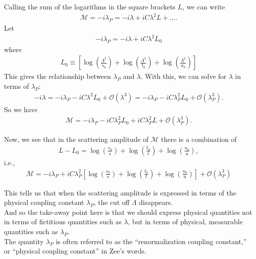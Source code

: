 \documentclass{book}
\theoremstyle{definition}
\newcommand{\f}[2]{\frac{#1}{#2}}
\newcommand{\lp}{\left(}
\newcommand{\rp}{\right)}
\newcommand{\lb}{\left[}
\newcommand{\rb}{\right]}
\begin{document}
Calling the sum of the logarithms in the square brackets $L$, we can write
\begin{align}
\mathcal{M} = -i\lambda_P = -i\lambda + iC\lambda^2 L + \dots.
\end{align}
Let
\begin{align}
-i\lambda_P = -i\lambda + iC\lambda^2 L_0
\end{align}
where
\begin{align}
L_0 \equiv \lb    \log\lp \f{\Lambda^2}{s_0} \rp + \log\lp \f{\Lambda^2}{t_0} \rp + \log\lp \f{\Lambda^2}{u_0} \rp \rb
\end{align}
This gives the relationship between $\lambda_P$ and $\lambda$. With this, we can solve for $\lambda$ in terms of $\lambda_P$:
\begin{align}
-i\lambda = -i\lambda_P - iC\lambda^2 L_0 + \mathcal{O}(\lambda^3) = -i\lambda_P - iC\lambda^2_P L_0 + \mathcal{O}(\lambda_P^3).
\end{align}
So we have
\begin{align}
\mathcal{M} = -i\lambda_P - iC\lambda_P^2 L_0 +iC\lambda_P^2 L + \mathcal{O}(\lambda_P^3).
\end{align}


Now, we see that in the scattering amplitude of $\mathcal{M}$ there is a combination of
\begin{align}
L - L_0 = \log \lp \f{s_0}{s} \rp + \log \lp \f{t_0}{t} \rp + \log \lp \f{u_0}{u} \rp,
\end{align}
i.e.,
\begin{align}
\boxed{\mathcal{M} = -i\lambda_P + iC\lambda_P^2 \lb \log \lp \f{s_0}{s} \rp + \log \lp \f{t_0}{t} \rp + \log \lp \f{u_0}{u} \rp  \rb + \mathcal{O}(\lambda_P^3)}
\end{align}


This tells us that when the scattering amplitude is expressed in terms of the physical coupling constant $\lambda_P$, the cut off $\Lambda$ disappears. \\


And so the take-away point here is that we should express physical quantities not in terms of fictitious quantities such as $\lambda$, but in terms of physical, measurable quantities such as $\lambda_P$. \\

The quantity $\lambda_P$ is often referred to as the ``renormalization coupling constant,'' or ``physical coupling constant'' in Zee's words.  
\end{document}
